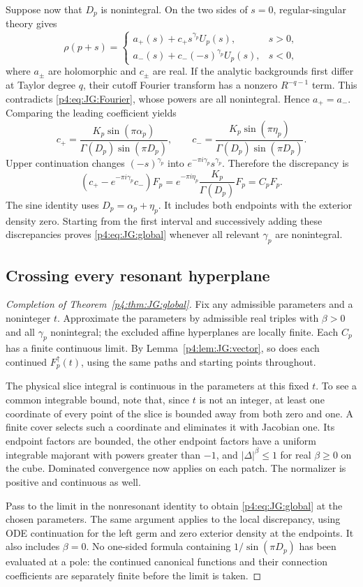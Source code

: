 \documentclass[11pt,a4paper]{article}
\theoremstyle{definition}
\theoremstyle{remark}
\numberwithin{equation}{section}
\begin{document}
Suppose now that $D_p$ is nonintegral. On the two sides of $s=0$,
regular-singular theory gives
\[
 \rho(p+s)=
 \begin{cases}
  a_+(s)+c_+s^{\gamma_p}U_p(s),&s>0,\\
  a_-(s)+c_-(-s)^{\gamma_p}U_p(s),&s<0,
 \end{cases}
\]
where $a_\pm$ are holomorphic and $c_\pm$ are real.
If the analytic backgrounds first differ at Taylor degree $q$, their
cutoff Fourier transform has a nonzero $R^{-q-1}$ term. This
contradicts \eqref{p4:eq:JG:Fourier}, whose powers are all nonintegral.
Hence $a_+=a_-$.
Comparing the leading coefficient yields
\[
 c_+=\frac{K_p\sin(\pi\alpha_p)}
               {\Gamma(D_p)\sin(\pi D_p)},\qquad
 c_-=\frac{K_p\sin(\pi\eta_p)}
               {\Gamma(D_p)\sin(\pi D_p)}.
\]
Upper continuation changes $(-s)^{\gamma_p}$ into
$e^{-\pi i\gamma_p}s^{\gamma_p}$. Therefore the discrepancy is
\[
 (c_+-e^{-\pi i\gamma_p}c_-)F_p
 =e^{-\pi i\eta_p}\frac{K_p}{\Gamma(D_p)}F_p=C_pF_p.
\]
The sine identity uses $D_p=\alpha_p+\eta_p$.
It includes both endpoints with the exterior density zero.
Starting from the first interval and successively adding these
discrepancies proves \eqref{p4:eq:JG:global} whenever all relevant
$\gamma_p$ are nonintegral.

\subsection{Crossing every resonant hyperplane}

\begin{proof}[Completion of Theorem~\ref{p4:thm:JG:global}]
Fix any admissible parameters and a noninteger $t$. Approximate the
parameters by admissible real triples with $\beta>0$ and all
$\gamma_p$ nonintegral; the excluded affine hyperplanes are locally finite.
Each $C_p$ has a finite continuous limit. By
Lemma~\ref{p4:lem:JG:vector}, so does each continued $F_p^\uparrow(t)$,
using the same paths and starting points throughout.

The physical slice integral is continuous in the parameters at this
fixed $t$. To see a common integrable bound, note that, since $t$ is
not an integer, at least one coordinate of every point of the slice
is bounded away from both zero and one. A finite cover selects such
a coordinate and eliminates it with Jacobian one. Its endpoint
factors are bounded, the other endpoint factors have a uniform
integrable majorant with powers greater than $-1$, and
$|\Delta|^\beta\le1$ for real $\beta\ge0$ on the cube. Dominated
convergence now applies on each patch. The normalizer is positive
and continuous as well.

Pass to the limit in the nonresonant identity to obtain
\eqref{p4:eq:JG:global} at the chosen parameters. The same argument
applies to the local discrepancy, using ODE continuation for the
left germ and zero exterior density at the endpoints. It also
includes $\beta=0$. No one-sided formula containing
$1/\sin(\pi D_p)$ has been evaluated at a pole: the continued
canonical functions and their connection coefficients are separately
finite before the limit is taken.
\end{proof}
\end{document}
